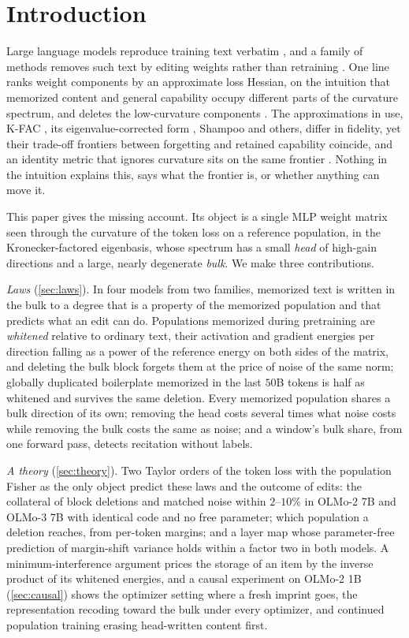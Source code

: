 \documentclass{article}
\theoremstyle{definition}\newtheorem{law}{Empirical law}
\begin{document}
\section{Introduction}

Large language models reproduce training text verbatim \citep{carlini2023quantifying,nasr2023scalable}, and a family of methods removes such text by editing weights rather than retraining \citep{eldan2023whos,jang2023knowledge,maini2024tofu}. One line ranks weight components by an approximate loss Hessian, on the intuition that memorized content and general capability occupy different parts of the curvature spectrum, and deletes the low-curvature components \citep{goodfire2025memorization,habo2026}. The approximations in use, K-FAC \citep{martens2015optimizing}, its eigenvalue-corrected form \citep{george2018fast}, Shampoo \citep{gupta2018shampoo} and others, differ in fidelity, yet their trade-off frontiers between forgetting and retained capability coincide, and an identity metric that ignores curvature sits on the same frontier \citep{habo2026}. Nothing in the intuition explains this, says what the frontier is, or whether anything can move it.

This paper gives the missing account. Its object is a single MLP weight matrix seen through the curvature of the token loss on a reference population, in the Kronecker-factored eigenbasis, whose spectrum has a small \emph{head} of high-gain directions and a large, nearly degenerate \emph{bulk}. We make three contributions.

\emph{Laws} (\cref{sec:laws}). In four models from two families, memorized text is written in the bulk to a degree that is a property of the memorized population and that predicts what an edit can do. Populations memorized during pretraining are \emph{whitened} relative to ordinary text, their activation and gradient energies per direction falling as a power of the reference energy on both sides of the matrix, and deleting the bulk block forgets them at the price of noise of the same norm; globally duplicated boilerplate memorized in the last $50$B tokens is half as whitened and survives the same deletion. Every memorized population shares a bulk direction of its own; removing the head costs several times what noise costs while removing the bulk costs the same as noise; and a window's bulk share, from one forward pass, detects recitation without labels.

\emph{A theory} (\cref{sec:theory}). Two Taylor orders of the token loss with the population Fisher as the only object predict these laws and the outcome of edits: the collateral of block deletions and matched noise within $2$--$10\%$ in OLMo-2 7B and OLMo-3 7B with identical code and no free parameter; which population a deletion reaches, from per-token margins; and a layer map whose parameter-free prediction of margin-shift variance holds within a factor two in both models. A minimum-interference argument prices the storage of an item by the inverse product of its whitened energies, and a causal experiment on OLMo-2 1B (\cref{sec:causal}) shows the optimizer setting where a fresh imprint goes, the representation recoding toward the bulk under every optimizer, and continued population training erasing head-written content first.
\end{document}
